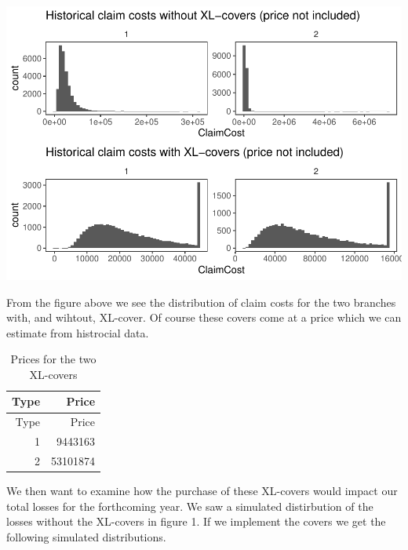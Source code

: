 \documentclass[]{article}
\begin{document}
\includegraphics{Projekt1_files/figure-latex/unnamed-chunk-12-1.pdf}

From the figure above we see the distribution of claim costs for the two
branches with, and wihtout, XL-cover. Of course these covers come at a
price which we can estimate from histrocial data.

\begin{longtable}[]{@{}rr@{}}
\caption{Prices for the two XL-covers}\tabularnewline
\toprule
Type & Price\tabularnewline
\midrule
\endfirsthead
\toprule
Type & Price\tabularnewline
\midrule
\endhead
1 & 9443163\tabularnewline
2 & 53101874\tabularnewline
\bottomrule
\end{longtable}

We then want to examine how the purchase of these XL-covers would impact
our total losses for the forthcoming year. We saw a simulated
distirbution of the losses without the XL-covers in figure 1. If we
implement the covers we get the following simulated distributions.
\end{document}
